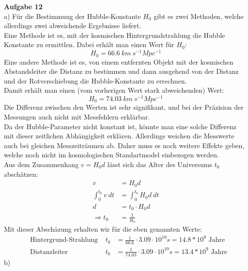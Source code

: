 \documentclass[11pt, a4paper]{article}
\begin{document}
\thispagestyle{fancy}
\noindent
{\large\textbf{Aufgabe 12}} \\[0.2cm]
a) Für die Bestimmung der Hubble-Konstante $H_0$ gibt es zwei Methoden, 
welche allerdings zwei abweichende Ergebnisse liefert.\\
Eine Methode ist es, mit der kosmischen Hintergrundstrahlung die Hubble
Konstante zu ermittlen. Dabei erhält man einen Wert für $H_0$:
\[
	H_0 = 66.6 \ km \ s^{-1} Mpc^{-1}
\]
Eine andere Methode ist es, von einem entfernten Objekt mit der 
kosmischen Abstandsleiter die Distanz zu bestimmen
und dann ausgehend von der 
Distanz und der Rotverschiebung die Hubble-Konstante zu errechnen.
\\
Damit erhält man einen (vom vorherigen Wert stark abweichenden) Wert:
\[
	H_0 = 74.03  \ km \ s^{-1} Mpc^{-1}
\]
Die Differenz zwischen den Werten ist sehr signifikant, und bei der 
Präzision der Messungen auch nicht mit Messfehlern erklärbar. \\
Da der Hubble-Parameter nicht konstant ist, könnte man eine 
solche Differenz mit dieser zeitlichen Abhängigkeit erklären. Allerdings 
weichen die Messwerte auch bei gleichen Messzeiträumen ab. Daher muss 
es noch weitere Effekte geben, welche noch nicht im kosmologischen 
Standartmodel einbezogen werden. 
\\[0.2cm]
Aus dem Zusammenhang $v = H_0 d$ lässt sich das Alter des Universums $t_0$
abschätzen:
\begin{align*}
	v &= H_0 d \\
	\int_0^{t_0} v \ dt &= \int_0^{t_0} H_0 d \ dt \\
	d &= t_0 \cdot H_0 d \\
	\Rightarrow 
	t_0 &= \frac{1}{H_0}
\end{align*}
Mit dieser Abschäzung erhalten wir für die eben genannten Werte:
\begin{align*}
	&\text{Hintergrund-Strahlung } &
	t_0 &= \frac{1}{66.6} \cdot 3.09 \cdot 10^{19} s
	= 14.8 * 10^9 \text{ Jahre}
	\\
	&\text{Distanzleiter } &
	t_0 &= \frac{1}{74.03} \cdot 3.09 \cdot 10^{19} s
	= 13.4 * 10^9 \text{ Jahre}
\end{align*}
\vspace{0.5cm}
b) 
\end{document}
